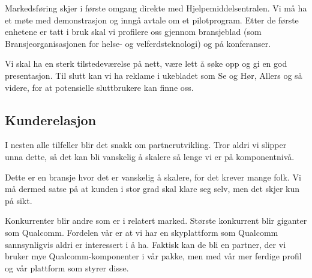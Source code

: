 Markedsføring skjer i første omgang direkte med Hjelpemiddelsentralen. Vi må ha
et møte med demonstrasjon og inngå avtale om et pilotprogram. Etter de første
enhetene er tatt i bruk skal vi profilere oss gjennom bransjeblad (som
Bransjeorganisasjonen for helse- og velferdsteknologi) og på konferanser.

Vi skal ha en sterk tilstedeværelse på nett, være lett å søke opp og gi en god
presentasjon. Til slutt kan vi ha reklame i ukebladet som Se og Hør, Allers og
så videre, for at potensielle sluttbrukere kan finne oss.

\subsection{Kunderelasjon}



I nesten alle tilfeller blir det snakk om partnerutvikling. Tror aldri vi
slipper unna dette, så det kan bli vanskelig å skalere så lenge vi er på
komponentnivå.

Dette er en bransje hvor det er vanskelig å skalere, for det krever mange folk.
Vi må dermed satse på at kunden i stor grad skal klare seg selv, men det skjer
kun på sikt.

Konkurrenter blir andre som er i relatert marked. Største konkurrent blir
giganter som Qualcomm. Fordelen vår er at vi har en skyplattform som Qualcomm
sannsynligvis aldri er interessert i å ha. Faktisk kan de bli en partner, der
vi bruker mye Qualcomm-komponenter i vår pakke, men med vår mer ferdige profil
og vår plattform som styrer disse.

